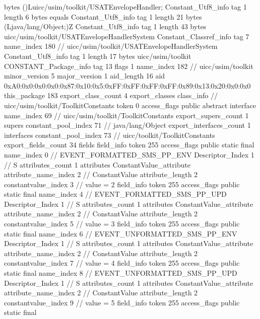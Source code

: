 {{{			bytes	()Luicc/usim/toolkit/USATEnvelopeHandler;
		}
		Constant_Utf8_info {
			tag	1
			length	6
			bytes	equals
		}
		Constant_Utf8_info {
			tag	1
			length	21
			bytes	(Ljava/lang/Object;)Z
		}
		Constant_Utf8_info {
			tag	1
			length	43
			bytes	uicc/usim/toolkit/USATEnvelopeHandlerSystem
		}
		Constant_Classref_info {
			tag	7
			name_index	180		// uicc/usim/toolkit/USATEnvelopeHandlerSystem
		}
		Constant_Utf8_info {
			tag	1
			length	17
			bytes	uicc/usim/toolkit
		}
		CONSTANT_Package_info {
			tag	13
			flags	1
			name_index	182		// uicc/usim/toolkit
			minor_version	5
			major_version	1
			aid_length	16
			aid	0xA0:0x0:0x0:0x0:0x87:0x10:0x5:0xFF:0xFF:0xFF:0xFF:0x89:0x13:0x20:0x0:0x0
		}
	}
	this_package	183
	export_class_count	4
	export_classes {
		class_info {		// uicc/usim/toolkit/ToolkitConstants
			token	0
			access_flags	public abstract interface
			name_index	69		// uicc/usim/toolkit/ToolkitConstants
			export_supers_count	1
			supers {
				constant_pool_index	71		// java/lang/Object
			}
			export_interfaces_count	1
			interfaces {
				constant_pool_index	73		// uicc/toolkit/ToolkitConstants
			}
			export_fields_count	34
			fields {
			field_info {
				token	255
				access_flags	public static final
				name_index	0		// EVENT_FORMATTED_SMS_PP_ENV
				Descriptor_Index	1		// S
				attributes_count	1
				attributes {
				ConstantValue_attribute {
					attribute_name_index	2		// ConstantValue
					attribute_length	2
					constantvalue_index	3		// value = 2
				}
				}
			}
			field_info {
				token	255
				access_flags	public static final
				name_index	4		// EVENT_FORMATTED_SMS_PP_UPD
				Descriptor_Index	1		// S
				attributes_count	1
				attributes {
				ConstantValue_attribute {
					attribute_name_index	2		// ConstantValue
					attribute_length	2
					constantvalue_index	5		// value = 3
				}
				}
			}
			field_info {
				token	255
				access_flags	public static final
				name_index	6		// EVENT_UNFORMATTED_SMS_PP_ENV
				Descriptor_Index	1		// S
				attributes_count	1
				attributes {
				ConstantValue_attribute {
					attribute_name_index	2		// ConstantValue
					attribute_length	2
					constantvalue_index	7		// value = 4
				}
				}
			}
			field_info {
				token	255
				access_flags	public static final
				name_index	8		// EVENT_UNFORMATTED_SMS_PP_UPD
				Descriptor_Index	1		// S
				attributes_count	1
				attributes {
				ConstantValue_attribute {
					attribute_name_index	2		// ConstantValue
					attribute_length	2
					constantvalue_index	9		// value = 5
				}
				}
			}
			field_info {
				token	255
				access_flags	public static final
}}}}}
